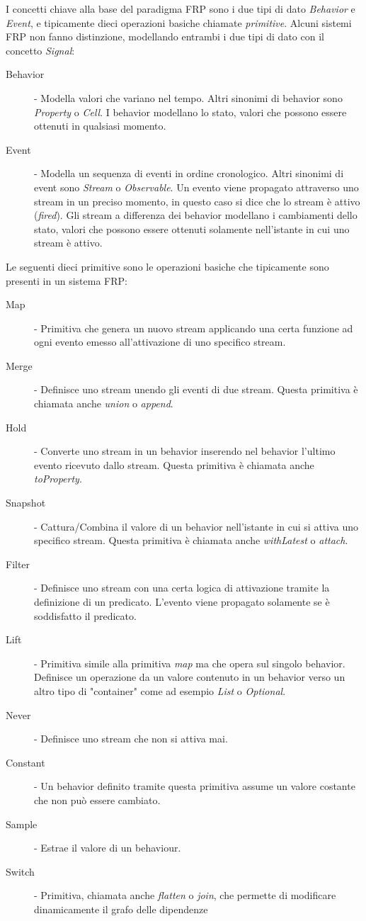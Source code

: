 \documentclass[../main.tex]{subfiles}
\begin{document}
I concetti chiave alla base del paradigma FRP sono i due tipi di dato \textit{Behavior} e \textit{Event}, e tipicamente dieci operazioni basiche chiamate \textit{primitive}. Alcuni sistemi FRP non fanno distinzione, modellando entrambi i due tipi di dato con il concetto \textit{Signal}:
\begin{description}
    \item[Behavior] - Modella valori che variano nel tempo. Altri sinonimi di behavior sono \textit{Property} o \textit{Cell}. I behavior modellano lo stato, valori che possono essere ottenuti in qualsiasi momento.
    \item[Event] - Modella un sequenza di eventi in ordine cronologico. Altri sinonimi di event sono \textit{Stream} o \textit{Observable}. Un evento viene propagato attraverso uno stream in un preciso momento, in questo caso si dice che lo stream è attivo (\textit{fired}). Gli stream a differenza dei behavior modellano i cambiamenti dello stato, valori che possono essere ottenuti solamente nell'istante in cui uno stream è attivo.
\end{description}

Le seguenti dieci primitive sono le operazioni basiche che tipicamente sono presenti in un sistema FRP:
\begin{description}
    \item[Map] - Primitiva che genera un nuovo stream applicando una certa funzione ad ogni evento emesso all'attivazione di uno specifico stream.
    \item[Merge] - Definisce uno stream unendo gli eventi di due stream. Questa primitiva è chiamata anche \textit{union} o \textit{append}.
    \item[Hold] - Converte uno stream in un behavior inserendo nel behavior l'ultimo evento ricevuto dallo stream. Questa primitiva è chiamata anche \textit{toProperty}.
    \item[Snapshot] - Cattura/Combina il valore di un behavior nell'istante in cui si attiva uno specifico stream. Questa primitiva è chiamata anche \textit{withLatest} o \textit{attach}.
    \item[Filter] - Definisce uno stream con una certa logica di attivazione tramite la definizione di un predicato. L'evento viene propagato solamente se è soddisfatto il predicato.
    \item[Lift] - Primitiva simile alla primitiva \textit{map} ma che opera sul singolo behavior. Definisce un operazione da un valore contenuto in un behavior verso un altro tipo di "container" come ad esempio \textit{List} o \textit{Optional}.
    \item[Never] - Definisce uno stream che non si attiva mai.
    \item[Constant] - Un behavior definito tramite questa primitiva assume un valore costante che non può essere cambiato.
    \item[Sample] - Estrae il valore di un behaviour.
    \item[Switch] - Primitiva, chiamata anche \textit{flatten} o \textit{join}, che permette di modificare dinamicamente il grafo delle dipendenze
\end{description}
\end{document}

